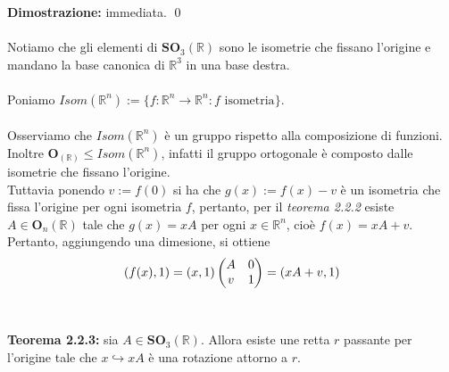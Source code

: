 \documentclass{article}
\begin{document}
\textbf{Dimostrazione:} immediata. \qed \\ \\
Notiamo che gli elementi di $\mathbf{SO}_3(\mathbb{R})$ sono le isometrie che fissano l'origine e mandano la base canonica di $\mathbb{R}^3$ in una base destra. \\ \\
Poniamo $Isom(\mathbb{R}^n) := \{ f : \mathbb{R}^n \longrightarrow \mathbb{R}^n : f \text{ isometria} \}$. \\ \\
Osserviamo che $Isom(\mathbb{R}^n)$ è un gruppo rispetto alla composizione di funzioni. Inoltre $\mathbf{O}_(\mathbb{R}) \leq Isom(\mathbb{R}^n)$, infatti il gruppo ortogonale è composto dalle isometrie che fissano l'origine.  \\
Tuttavia ponendo $v := f(0)$ si ha che $g(x) := f(x) - v$ è un isometria che fissa l'origine per ogni isometria $f$, pertanto, per il \textit{teorema 2.2.2} esiste $A \in \mathbf{O}_n(\mathbb{R})$ tale che $g(x) = xA$ per ogni $x \in \mathbb{R}^n$, cioè $f(x) = xA + v$. \\
Pertanto, aggiungendo una dimesione, si ottiene
\begin{gather}
    (f(x), 1) = (x, 1) \begin{pmatrix}
        A & 0 \\
        v & 1 
    \end{pmatrix}
    = (xA + v, 1) \notag
\end{gather} \\ \\
\textbf{Teorema 2.2.3:} sia $A \in \mathbf{SO}_3(\mathbb{R})$. Allora esiste une retta $r$ passante per l'origine tale che $x \hookrightarrow xA$ è una rotazione attorno a $r$. \\
\end{document}
